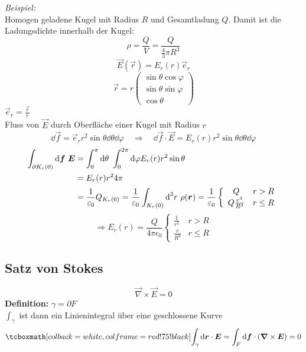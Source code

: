 \emph{Beispiel:}\\
Homogen geladene Kugel mit Radius $ R $ und Gesamtladung $ Q $. Damit ist die Ladungsdichte innerhalb der Kugel:
\begin{equation*}
\rho = \frac{Q}{V} = \frac{Q}{\frac{4}{3} \pi R^3}
\end{equation*}
%
%
%
%
%
%
\begin{equation*}
\vec{E}(\vec{r}) = E_r (r) \vec{e}_r
\end{equation*}
\begin{equation*}
\vec{r} = r \begin{pmatrix}
\sin \theta \cos \varphi \\ \sin \theta \sin \varphi \\ \cos \theta
\end{pmatrix}
\end{equation*}
$ \vec{e}_r = \frac{\vec{r}}{r} $\\
Fluss von $\vec{E}$ durch Oberfläche einer Kugel mit Radius $r$
%
%
%
%
%
%
$$\dd \vec{f} = \vec{e}_r r^2 \sin \theta \dd \theta \dd \varphi \quad \Rightarrow \quad \dd \vec{f} \cdot \vec{E} = E_r(r)r^2\sin \theta \dd \theta \dd \varphi $$
\begin{align*}
\int_{\partial K_r (0)} \textrm{d}\bm{f}\ \bm{E} &= \int_0^\pi \textrm{d} \theta \ \int_{0}^{2 \pi} \textrm{d} \varphi E_r (r) r^2 \sin \theta\\
&= E_r (r) r^2 4 \pi\\
&= \frac{1}{\varepsilon_0} Q_{K_r (0)} = \frac{1}{\varepsilon_0} \int_{K_r (0)} \textrm{d}^3 r\ \rho(\bm{r}) = \frac{1}{\varepsilon_0} \left\{ \begin{array}{cc}
Q & r > R\\
Q \frac{r^3}{R^3} & r \leq R 		
\end{array}\right.
\end{align*}
$$\Rightarrow E_r(r) = \frac{Q}{4 \pi \epsilon_0}\left\{ \begin{array}{cc}
\frac{1}{r^2} & r > R\\
\frac{r}{R^3} & r \leq R 		
\end{array}\right.$$
%
%
%
%
%
%
\subsection{Satz von Stokes}

\begin{equation*}
\vec{\nabla} \times \vec{E} = 0
\end{equation*}
\textbf{Definition:} $ \gamma = \partial F $\\
$ \int_\gamma $ ist dann ein Linienintegral über eine geschlossene Kurve
\begin{equation*}
\rmbox{\int_\gamma \dd \vec{r} \cdot \vec{E} = \int_F \dd\vec{f} \cdot (\vec{\nabla} \times \vec{E}) = 0}
\end{equation*}

